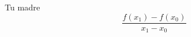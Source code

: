 \documentclass{article}
\begin{document}
Tu madre
\begin{equation}\frac{f(x_1) - f(x_0)}{x_1 - x_0}
\end{equation}
\end{document}
